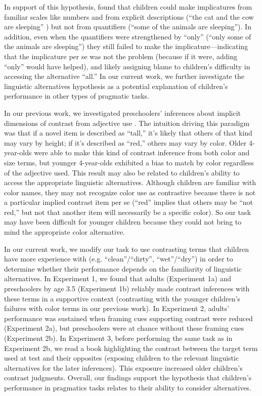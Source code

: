 \documentclass[10pt,letterpaper]{article}
\begin{document}
In support of this hypothesis,  found that children could make implicatures from familiar scales like numbers and from explicit descriptions (``the cat and the cow are sleeping'' ) but not from quantifiers (``some of the animals are sleeping''). In addition, even when the quantifiers were strengthened by ``only'' (``only some of the animals are sleeping'') they still failed to make the implicature---indicating that the implicature per se was not the problem (because if it were, adding ``only'' would have helped), and likely assigning blame to children's difficulty in accessing the alternative ``all.'' In our current work, we further investigate the linguistic alternatives hypothesis as a potential explanation of children's performance in other types of pragmatic tasks.  

In our previous work, we investigated preschoolers' inferences about implicit dimensions of contrast from adjective use \cite{horowitz2012}. The intuition driving this paradigm was that if a novel item is described as ``tall,'' it's likely that others of that kind may vary by height; if it's described as ``red,'' others may vary by color. Older 4-year-olds were able to make this kind of contrast inference from both color and size terms, but younger 4-year-olds exhibited a bias to match by color regardless of the adjective used. This result may also be related to children's ability to access the appropriate linguistic alternatives. Although children are familiar with color names, they may not recognize color use as contrastive because there is not a particular implied contrast item per se (``red'' implies that others may be ``not red,'' but not that another item will necessarily be a specific color). So our task may have been difficult for younger children because they could not bring to mind the appropriate color alternative. 

In our current work, we modify our task to use contrasting terms that children have more experience with (e.g. ``clean''/``dirty'', ``wet''/``dry'') in order to determine whether their performance depends on the familiarity of linguistic alternatives. In Experiment 1, we found that adults (Experiment 1a) and preschoolers by age 3.5 (Experiment 1b) reliably made contrast inferences with these terms in a supportive context (contrasting with the younger children's failures with color terms in our previous work).  In Experiment 2, adults' performance was sustained when framing cues supporting contrast were reduced (Experiment 2a), but preschoolers were at chance without these framing cues (Experiment 2b).  In Experiment 3, before performing the same task as in Experiment 2b, we read a book highlighting the contrast between the target term used at test and their opposites (exposing children to the relevant linguistic alternatives for the later inferences). This exposure increased older children's contrast judgments.  Overall, our findings support the hypothesis that children's performance in pragmatics tasks relates to their ability to consider alternatives.
\end{document}
